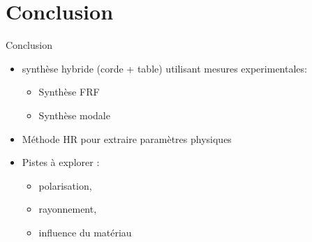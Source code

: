 \section*{Conclusion}
\begin{frame}{Conclusion}
  
\beamerdefaultoverlayspecification{} %

	\begin{itemize}
    \item synthèse hybride (corde + table) utilisant mesures experimentales:
        \begin{itemize}
          \item Synthèse FRF 
          \item Synthèse modale
        \end{itemize}
	  \item Méthode HR pour extraire paramètres physiques
	  \item Pistes à explorer : 
        \begin{itemize}
          \item polarisation,
          \item rayonnement,
          \item influence du matériau
        \end{itemize}	\end{itemize}

\end{frame}
